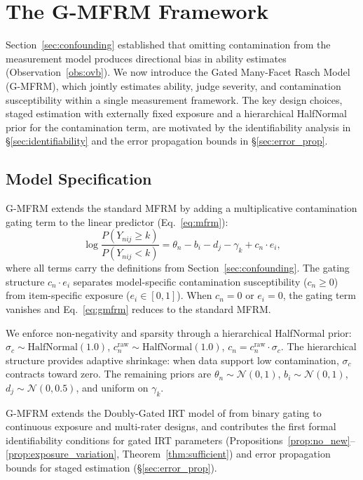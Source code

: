 \section{The G-MFRM Framework}
\label{sec:method}

Section~\ref{sec:confounding} established that omitting contamination from the measurement model produces directional bias in ability estimates (Observation~\ref{obs:ovb}). We now introduce the Gated Many-Facet Rasch Model (G-MFRM), which jointly estimates ability, judge severity, and contamination susceptibility within a single measurement framework. The key design choices, staged estimation with externally fixed exposure and a hierarchical HalfNormal prior for the contamination term, are motivated by the identifiability analysis in \S\ref{sec:identifiability} and the error propagation bounds in \S\ref{sec:error_prop}.

\subsection{Model Specification}
\label{sec:model_spec}

G-MFRM extends the standard MFRM \citep{linacre1989mfrm, linacre1994mfrm} by adding a multiplicative contamination gating term to the linear predictor (Eq.~\ref{eq:mfrm}):
%
\begin{equation}
\label{eq:gmfrm}
\log \frac{P(Y_{nij} \geq k)}{P(Y_{nij} < k)} = \theta_n - b_i - d_j - \gamma_k + c_n \cdot e_i,
\end{equation}
%
where all terms carry the definitions from Section~\ref{sec:confounding}. The gating structure $c_n \cdot e_i$ separates model-specific contamination susceptibility ($c_n \geq 0$) from item-specific exposure ($e_i \in [0,1]$). When $c_n = 0$ or $e_i = 0$, the gating term vanishes and Eq.~\ref{eq:gmfrm} reduces to the standard MFRM.

We enforce non-negativity and sparsity through a hierarchical HalfNormal prior: $\sigma_c \sim \text{HalfNormal}(1.0)$, $c^{\mathrm{raw}}_n \sim \text{HalfNormal}(1.0)$, $c_n = c^{\mathrm{raw}}_n \cdot \sigma_c$. The hierarchical structure provides adaptive shrinkage: when data support low contamination, $\sigma_c$ contracts toward zero. The remaining priors are $\theta_n \sim \mathcal{N}(0, 1)$, $b_i \sim \mathcal{N}(0, 1)$, $d_j \sim \mathcal{N}(0, 0.5)$, and uniform on $\gamma_k$.

G-MFRM extends the Doubly-Gated IRT model of \citet{shu2013dgirt} from binary gating to continuous exposure and multi-rater designs, and contributes the first formal identifiability conditions for gated IRT parameters (Propositions~\ref{prop:no_new}--\ref{prop:exposure_variation}, Theorem~\ref{thm:sufficient}) and error propagation bounds for staged estimation (\S\ref{sec:error_prop}).

